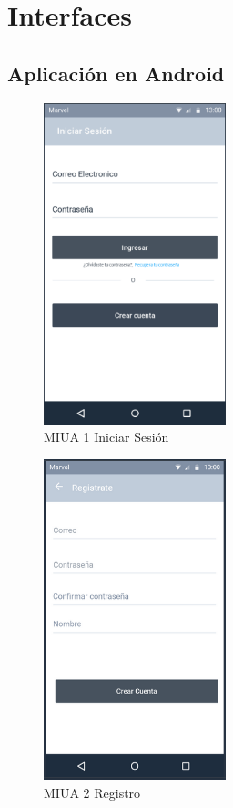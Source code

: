 \section{Interfaces}
\subsection{Aplicación en Android}
\begin{figure}[h]
    \centering
    \includegraphics[width=200px]{capitulo4/imagenes/android/MIUA_1.png}
    \caption{MIUA 1 Iniciar Sesión}
    \label{fig:MIUA-1} %
\end{figure}
\newpage
\begin{figure}[h]
    \centering
    \includegraphics[width=200px]{capitulo4/imagenes/android/MIUA_2.png}
    \caption{MIUA 2 Registro}
    \label{fig:MIUA-2} %
\end{figure}
